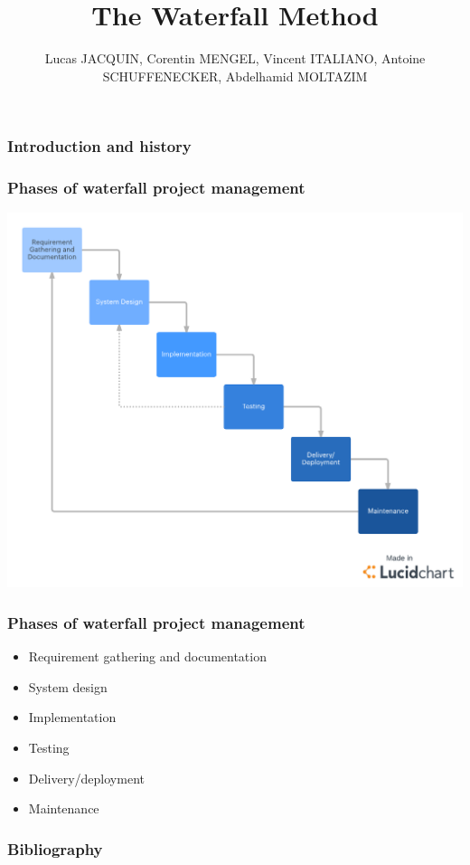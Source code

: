 \documentclass[handout]{beamer}
\title{The Waterfall Method}
\author{Lucas JACQUIN, Corentin MENGEL, Vincent ITALIANO, Antoine SCHUFFENECKER, Abdelhamid MOLTAZIM}
\begin{document}
\begin{frame}    
    
    \maketitle

\end{frame}

\begin{frame}
    \frametitle{Introduction and history}
\end{frame}

\begin{frame}
    \frametitle{Phases of waterfall project management}
    \includegraphics[scale=0.25]{Images/WaterfallDiagram.png}
\end{frame}

\begin{frame}
    \frametitle{Phases of waterfall project management}
    \begin{itemize}
        \setlength\itemsep{1em}
        \item Requirement gathering and documentation \pause
        \item System design \pause
        \item Implementation \pause
        \item Testing \pause
        \item Delivery/deployment \pause
        \item Maintenance
    \end{itemize}
\end{frame}


\nocite{*}
\begin{frame}
    \frametitle{Bibliography}

    
        

\end{frame}
\end{document}
